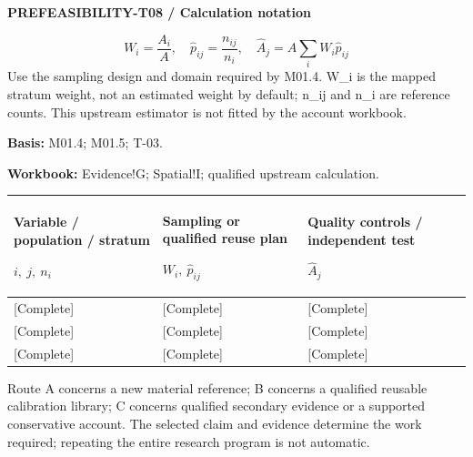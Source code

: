 \textbf{PREFEASIBILITY-T08 / Calculation notation}\par
{\fontsize{9}{11}\selectfont\[ W_i=\frac{A_i}{A},\quad \widehat p_{ij}=\frac{n_{ij}}{n_i},\quad \widehat A_j=A\sum_i W_i\widehat p_{ij} \]}
Use the sampling design and domain required by M01.4. W\_i is the mapped stratum weight, not an estimated weight by default; n\_ij and n\_i are reference counts. This upstream estimator is not fitted by the account workbook.\par
\textbf{Basis:} M01.4; M01.5; T-03.\par
\textbf{Workbook:} Evidence!G; Spatial!I; qualified upstream calculation.\par\endgroup
{\sffamily\fontsize{8.3}{10.3}\selectfont\begin{longtable}{@{}P{52.79mm} P{56.09mm} P{56.09mm}@{}}
\toprule
\textbf{Variable / population / stratum}\par {\normalfont\fontsize{8.2}{10}\selectfont $i,\ j,\ n_i$} & \textbf{Sampling or qualified reuse plan}\par {\normalfont\fontsize{8.2}{10}\selectfont $W_i,\ \widehat p_{ij}$} & \textbf{Quality controls / independent test}\par {\normalfont\fontsize{8.2}{10}\selectfont $\widehat A_j$}\\\midrule\endhead
\rule{0pt}{7.7mm}[Complete] & [Complete] & [Complete]\\\hline
\rule{0pt}{7.7mm}[Complete] & [Complete] & [Complete]\\\hline
\rule{0pt}{7.7mm}[Complete] & [Complete] & [Complete]\\\hline
\end{longtable}}
\begin{Notice}Route A concerns a new material reference; B concerns a qualified reusable calibration library; C concerns qualified secondary evidence or a supported conservative account. The selected claim and evidence determine the work required; repeating the entire research program is not automatic.\end{Notice}
\par\begingroup\sffamily\fontsize{8}{10}\selectfont\color{NEBGreen}\setlength{\parskip}{2pt}\setlength{\abovedisplayskip}{4pt}\setlength{\belowdisplayskip}{4pt}\setlength{\abovedisplayshortskip}{2pt}\setlength{\belowdisplayshortskip}{3pt}
